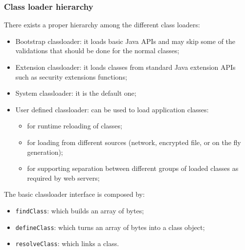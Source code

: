 \subsubsection{Class loader hierarchy}
There exists a proper hierarchy among the different class loaders:
\begin{itemize}
    \item Bootstrap classloader: it loads basic Java APIs and may skip some of the validations that should be done for the normal classes;
    \item Extension classloader: it loads classes from standard Java extension APIs such as security extensions functions;
    \item System classloader: it is the default one;
    \item User defined classloader: can be used to load application classes:
    \begin{itemize}
        \item for runtime reloading of classes;
        \item for loading from different sources (network, encrypted file, or on the fly generation);
        \item for supporting separation between different groups of loaded classes as required by web servers;
    \end{itemize}
\end{itemize}
The basic classloader interface is composed by:
\begin{itemize}
    \item \verb|findClass|: which builds an array of bytes;
    \item \verb|defineClass|: which turns an array of bytes into a class object;
    \item \verb|resolveClass|: which links a class.
\end{itemize}

